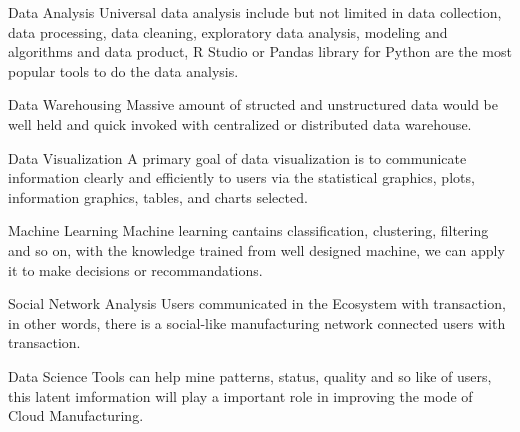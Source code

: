 \begin{asparadesc}
\item[Data Analysis] Universal data analysis include but not limited in data collection, data processing, data cleaning, exploratory data analysis, modeling and algorithms and data product, R Studio or Pandas library for Python are the most popular tools to do the data analysis.
\item[Data Warehousing] Massive amount of structed and unstructured data would be well held and quick invoked with centralized or distributed data warehouse. 
\item[Data Visualization] A primary goal of data visualization is to communicate information clearly and efficiently to users via the statistical graphics, plots, information graphics, tables, and charts selected.
\item[Machine Learning] Machine learning cantains classification, clustering, filtering and so on, with the knowledge trained from well designed machine, we can apply it to make decisions or recommandations.
\item[Social Network Analysis] Users communicated in the Ecosystem with transaction, in other words, there is a social-like manufacturing network connected users with transaction.  
\end{asparadesc}

Data Science Tools can help mine patterns, status, quality and so like of users, this latent imformation will play a important role in improving the mode of Cloud Manufacturing.
